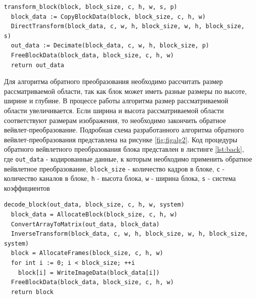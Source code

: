 \begin{lstlisting}[style=pseudocode,caption={Код процедуры transform\_block},label=lst:dir]
transform_block(block, block_size, c, h, w, s, p)
  block_data := CopyBlockData(block, block_size, c, h, w)
  DirectTransform(block_data, c, w, h, block_size, w, h, block_size, s)
  out_data := Decimate(block_data, c, w, h, block_size, p)
  FreeBlockData(block_data, block_size, c, h, w)
  return out_data
\end{lstlisting}
   
Для алгоритма обратного преобразования необходимо рассчитать размер рассматриваемой области, 
так как блок может иметь разные размеры по высоте, ширине и глубине. В процессе работы алгоритма 
размер рассматриваемой области увеличивается. Если ширина и высота рассматриваемой области 
соответствуют размерам изображения, то необходимо закончить обратное вейвлет-преобразование.
Подробная схема разработанного алгоритма обратного вейвлет-преобразования представлена на рисунке \ref{fig:figalg2}.
Код процедуры обратного вейвлетного преобразования блока представлен в листинге \ref{lst:back}, где \texttt{out\_data} - кодированные данные, к которым 
необходимо применить обратное вейвлетное преобразование,
\texttt{block\_size} - количество кадров в блоке, \texttt{с} - количество каналов в блоке, \texttt{h} - высота блока, \texttt{w}
- ширина блока, \texttt{s} - система коэффициентов

\begin{lstlisting}[style=pseudocode,caption={Код процедуры decode\_block},label=lst:back]
decode_block(out_data, block_size, c, h, w, system)
  block_data = AllocateBlock(block_size, c, h, w)
  ConvertArrayToMatrix(out_data, block_data)
  InverseTransform(block_data, c, w, h, block_size, w, h, block_size, system)
  block = AllocateFrames(block_size, c, h, w)
  for int i := 0; i < block_size; ++i
    block[i] = WriteImageData(block_data[i])
  FreeBlockData(block_data, block_size, c, h, w)
  return block
\end{lstlisting}


